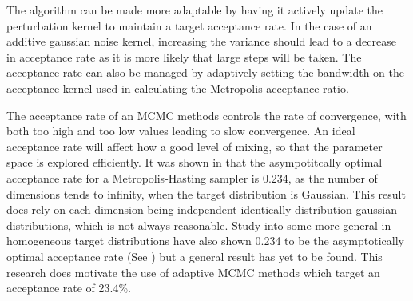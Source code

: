 \documentclass[11pt,a4paper]{article}
\theoremstyle{break}
\begin{document}
  \par The algorithm can be made more adaptable by having it actively update the perturbation kernel to maintain a target acceptance rate. In the case of an additive gaussian noise kernel, increasing the variance should lead to a decrease in acceptance rate as it is more likely that large steps will be taken. The acceptance rate can also be managed by adaptively setting the bandwidth on the acceptance kernel used in calculating the Metropolis acceptance ratio.

  \par The acceptance rate of an MCMC methods controls the rate of convergence, with both too high and too low values leading to slow convergence. An ideal acceptance rate will affect how a good level of mixing, so that the parameter space is explored efficiently. It was shown in \cite[]{weak_convergence_and_optimal_scaling_of_RWM_algorithms} that the asympotitcally optimal acceptance rate for a Metropolis-Hasting sampler is 0.234, as the number of dimensions tends to infinity, when the target distribution is Gaussian. This result does rely on each dimension being independent identically distribution gaussian distributions, which is not always reasonable. Study into some more general in-homogeneous target distributions have also shown 0.234 to be the asymptotically optimal acceptance rate (See \cite[]{optimal_scaling_for_various_metropolis_hastings_algorithms}) but a general result has yet to be found. This research does motivate the use of adaptive MCMC methods which target an acceptance rate of 23.4\%.


\end{document}
